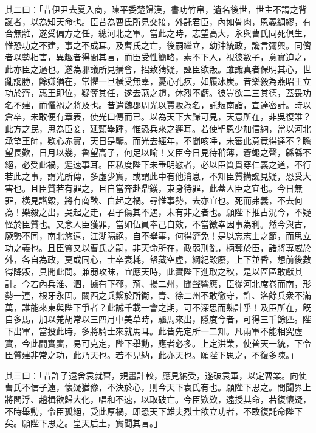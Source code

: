\begin{pinyinscope}
 
 其二曰：「昔伊尹去夏入商，陳平委楚歸漢，書功竹帛，遺名後世，世主不謂之背誕者，以為知天命也。臣昔為曹氏所見交接，外託君臣，內如骨肉，恩義綢繆，有合無離，遂受偏方之任，總河北之軍。當此之時，志望高大，永與曹氏同死俱生，惟恐功之不建，事之不成耳。及曹氏之亡，後嗣繼立，幼沖統政，讒言彌興。同儕者以勢相害，異趣者得間其言，而臣受性簡略，素不下人，視彼數子，意實迫之，此亦臣之過也。遂為邪議所見搆會，招致猜疑，誣臣欲叛。雖識真者保明其心，世亂讒勝，餘嫌猶在，常懼一旦橫受無辜，憂心孔疚，如履冰炭。昔樂毅為燕昭王立功於齊，惠王即位，疑奪其任，遂去燕之趙，休烈不虧。彼豈欲二三其德，蓋畏功名不建，而懼禍之將及也。昔遣魏郡周光以賈販為名，託叛南詣，宣達密計。時以倉卒，未敢便有章表，使光口傳而已。以為天下大歸可見，天意所在，非吳復誰？此方之民，思為臣妾，延頸舉踵，惟恐兵來之遲耳。若使聖恩少加信納，當以河北承望王師，欵心赤實，天日是鑒。而光去經年，不聞咳唾，未審此意竟得達不？瞻望長歎，日月以幾，魯望高子，何足以喻！又臣今日見待稍薄，蒼蠅之聲，緜緜不絕，必受此禍，遲速事耳。臣私度陛下未垂明慰者，必以臣質貫穿仁義之道，不行若此之事，謂光所傳，多虛少實，或謂此中有他消息，不知臣質搆讒見疑，恐受大害也。且臣質若有罪之，且自當奔赴鼎鑊，束身待罪，此蓋人臣之宜也。今日無罪，橫見譖毀，將有商鞅、白起之禍。尋惟事勢，去亦宜也。死而弗義，不去何為！樂毅之出，吳起之走，君子傷其不遇，未有非之者也。願陛下推古況今，不疑怪於臣質也。又念人臣獲罪，當如伍員奉己自效，不當徼幸因事為利。然今與古，厥勢不同，南北悠遠，江湖隔絕，自不舉事，何得濟免！是以忘志士之節，而思立功之義也。且臣質又以曹氏之嗣，非天命所在，政弱刑亂，柄奪於臣，諸將專威於外，各自為政，莫或同心，士卒衰耗，帑藏空虛，綱紀毀廢，上下並昏，想前後數得降叛，具聞此問。兼弱攻昧，宜應天時，此實陛下進取之秋，是以區區敢獻其計。今若內兵淮、泗，據有下邳，荊、揚二州，聞聲響應，臣從河北席卷而南，形勢一連，根牙永固。關西之兵繫於所衞，青、徐二州不敢徹守，許、洛餘兵衆不滿萬，誰能來東與陛下爭者？此誠千載一會之期，可不深思而熟計乎！及臣所在，旣自多馬，加以羗胡常以三四月中美草時，驅馬來出，隱度今者，可得三千餘匹。陛下出軍，當投此時，多將騎士來就馬耳。此皆先定所一二知。凡兩軍不能相究虛實，今此間實羸，易可克定，陛下舉動，應者必多。上定洪業，使普天一統，下令臣質建非常之功，此乃天也。若不見納，此亦天也。願陛下思之，不復多陳。」
 
 
 
 
 其三曰：「昔許子遠舍袁就曹，規畫計較，應見納受，遂破袁軍，以定曹業。向使曹氏不信子遠，懷疑猶豫，不決於心，則今天下袁氏有也。願陛下思之。間聞界上將閻浮、趙楫欲歸大化，唱和不速，以取破亡。今臣欵欵，遠授其命，若復懷疑，不時舉動，令臣孤絕，受此厚禍，即恐天下雄夫烈士欲立功者，不敢復託命陛下矣。願陛下思之。皇天后土，實聞其言。」
 

\end{pinyinscope}
